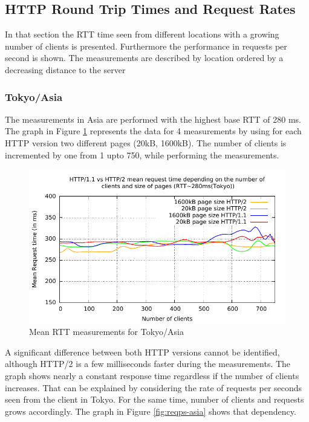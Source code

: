 \subsection{HTTP Round Trip Times and Request Rates}
\label{subsec:rtt}

In that section the RTT time seen from different locations with a growing number of clients is presented. Furthermore the performance in requests per second is shown. The measurements are described by location ordered by a decreasing distance to the server

\subsubsection{Tokyo/Asia}

The measurements in Asia are performed with the highest base RTT of 280 ms. The graph in Figure \ref{fig:latency-asia}  represents the data for 4 measurements by using for each HTTP version two different pages (20kB, 1600kB). The number of clients is incremented by one  from 1 upto 750, while performing the measurements.

\begin{figure}[H]
	\centering
	\includegraphics[scale=1,trim=0.0cm .0cm .0cm .0cm,clip]{images/latency-asia.pdf}
	\caption{Mean RTT measurements for Tokyo/Asia}
	\label{fig:latency-asia}
\end{figure}

A significant difference between both HTTP versions cannot be identified, although HTTP/2 is a few milliseconds faster during the measurements. The graph shows nearly a constant response time regardless if the number of clients increases. That can be explained by considering the rate of requests per seconds seen from the client in Tokyo. For the same time, number of clients
and requests grows accordingly. The graph in Figure \ref{fig:reqps-asia} shows that dependency.

